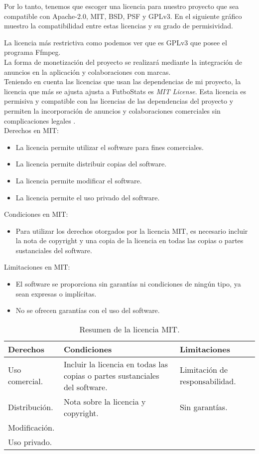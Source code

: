 Por lo tanto, tenemos que escoger una licencia para nuestro proyecto que sea compatible con Apache-2.0, MIT, BSD, PSF y GPLv3. En el siguiente gráfico muestro la compatibilidad entre estas licencias y su grado de permisividad.


La licencia más restrictiva como podemos ver que es GPLv3 que posee el programa Ffmpeg. \\
La forma de monetización del proyecto se realizará mediante la integración de anuncios en la aplicación y colaboraciones con marcas. \\
Teniendo en cuenta las licencias que usan las dependencias de mi proyecto, la licencia que más se ajusta ajusta a FutboStats es \textit{MIT License}. Esta licencia es permisiva y compatible con las licencias de las dependencias del proyecto y permiten la incorporación de anuncios y colaboraciones comerciales sin complicaciones legales \cite{MIT:latex}. \\
Derechos en MIT:
\begin{itemize}
    \item La licencia permite utilizar el software para fines comerciales.
    \item La licencia permite distribuir copias del software.
    \item La licencia permite modificar el software.
    \item La licencia permite el uso privado del software.
\end{itemize}
Condiciones en MIT:
\begin{itemize}
    \item Para utilizar los derechos otorgados por la licencia MIT, es necesario incluir la nota de copyright y una copia de la licencia en todas las copias o partes sustanciales del software.
\end{itemize}
Limitaciones en MIT:
\begin{itemize}
    \item El software se proporciona sin garantías ni condiciones de ningún tipo, ya sean expresas o implícitas.
    \item  No se ofrecen garantías con el uso del software.
\end{itemize}
\begin{table}[h!]
\centering
\begin{tabular}{>{\raggedright}m{4cm} >{\raggedright}m{4cm} >{\raggedright\arraybackslash}m{4cm}}
\toprule
\textbf{Derechos} & \textbf{Condiciones} & \textbf{Limitaciones} \\
\midrule
Uso comercial. & Incluir la licencia en todas las copias o partes sustanciales del software. & Limitación de responsabilidad. \\
Distribución. & Nota sobre la licencia y copyright. & Sin garantías. \\
Modificación. & & \\
Uso privado. & & \\
\bottomrule
\end{tabular}
\caption{Resumen de la licencia MIT.}
\end{table}

